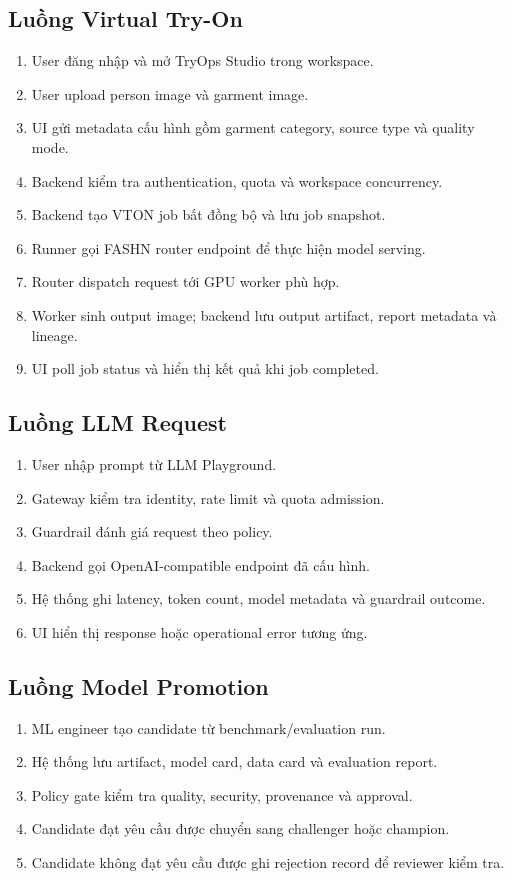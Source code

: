 \documentclass[12pt,a4paper,oneside]{report}
\begin{document}
\subsection{Luồng Virtual Try-On}

\begin{enumerate}
  \item User đăng nhập và mở TryOps Studio trong workspace.
  \item User upload person image và garment image.
  \item UI gửi metadata cấu hình gồm garment category, source type và quality mode.
  \item Backend kiểm tra authentication, quota và workspace concurrency.
  \item Backend tạo VTON job bất đồng bộ và lưu job snapshot.
  \item Runner gọi FASHN router endpoint để thực hiện model serving.
  \item Router dispatch request tới GPU worker phù hợp.
  \item Worker sinh output image; backend lưu output artifact, report metadata và lineage.
  \item UI poll job status và hiển thị kết quả khi job completed.
\end{enumerate}

\subsection{Luồng LLM Request}

\begin{enumerate}
  \item User nhập prompt từ LLM Playground.
  \item Gateway kiểm tra identity, rate limit và quota admission.
  \item Guardrail đánh giá request theo policy.
  \item Backend gọi OpenAI-compatible endpoint đã cấu hình.
  \item Hệ thống ghi latency, token count, model metadata và guardrail outcome.
  \item UI hiển thị response hoặc operational error tương ứng.
\end{enumerate}

\subsection{Luồng Model Promotion}

\begin{enumerate}
  \item ML engineer tạo candidate từ benchmark/evaluation run.
  \item Hệ thống lưu artifact, model card, data card và evaluation report.
  \item Policy gate kiểm tra quality, security, provenance và approval.
  \item Candidate đạt yêu cầu được chuyển sang challenger hoặc champion.
  \item Candidate không đạt yêu cầu được ghi rejection record để reviewer kiểm tra.
\end{enumerate}
\end{document}
